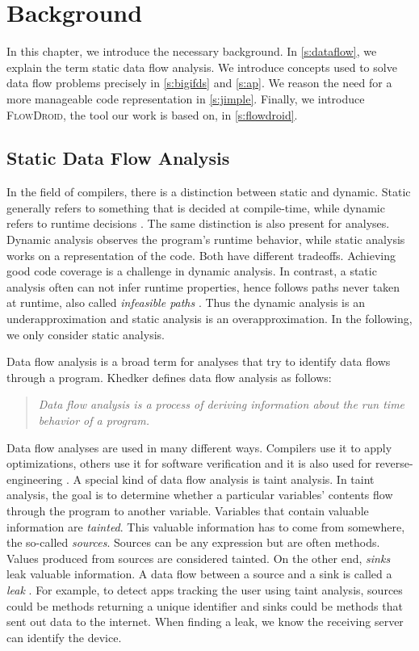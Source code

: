 \documentclass[../draft.tex]{subfiles}
\begin{document}
    \chapter{Background}\label{c:background}
    In this chapter, we introduce the necessary background.
    In \autoref{s:dataflow}, we explain the term static data flow analysis.
    We introduce concepts used to solve data flow problems precisely in \autoref{s:bigifds} and \autoref{s:ap}.
    We reason the need for a more manageable code representation in \autoref{s:jimple}.
    Finally, we introduce \textsc{FlowDroid}, the tool our work is based on, in \autoref{s:flowdroid}.

    \section{Static Data Flow Analysis}\label{s:dataflow}
    In the field of compilers, there is a distinction between static and dynamic.
    Static generally refers to something that is decided at compile-time, while dynamic refers to runtime decisions \cite{Aho1986}.
    The same distinction is also present for analyses.
    Dynamic analysis observes the program's runtime behavior, while static analysis works on a representation of the code.
    Both have different tradeoffs.
    Achieving good code coverage is a challenge in dynamic analysis.
    In contrast, a static analysis often can not infer runtime properties, hence follows paths never taken at runtime, also called \textit{infeasible paths} \cite{Arzt2017PhD}.
    Thus the dynamic analysis is an underapproximation and static analysis is an overapproximation.
    In the following, we only consider static analysis.

    Data flow analysis is a broad term for analyses that try to identify data flows through a program.
    Khedker \cite{Khedker2009} defines data flow analysis as follows:
    \begin{quote}
        \textit{Data flow analysis is a process of deriving information about the run time behavior of a program.}
    \end{quote}
    Data flow analyses are used in many different ways.
    Compilers use it to apply optimizations, others use it for software verification and it is also used for reverse-engineering \cite{Khedker2009}.
    A special kind of data flow analysis is taint analysis.
    In taint analysis, the goal is to determine whether a particular variables' contents flow through the program to another variable.
    Variables that contain valuable information are \textit{tainted}.
    This valuable information has to come from somewhere, the so-called \textit{sources}.
    Sources can be any expression but are often methods.
    Values produced from sources are considered tainted.
    On the other end, \textit{sinks} leak valuable information.
    A data flow between a source and a sink is called a \textit{leak} \cite{Arzt2017PhD}.
    For example, to detect apps tracking the user using taint analysis, sources could be methods returning a unique identifier and sinks could be methods that sent out data to the internet.
    When finding a leak, we know the receiving server can identify the device.
\end{document}
